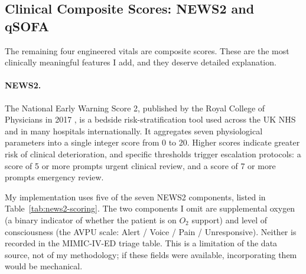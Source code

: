 \subsection*{Clinical Composite Scores: NEWS2 and qSOFA}

The remaining four engineered vitals are composite scores. These are the most clinically meaningful features I add, and they deserve detailed explanation.

\paragraph{NEWS2.} The National Early Warning Score 2, published by the Royal College of Physicians in 2017 \citep{rcp2017news2}, is a bedside risk-stratification tool used across the UK NHS and in many hospitals internationally. It aggregates seven physiological parameters into a single integer score from 0 to 20. Higher scores indicate greater risk of clinical deterioration, and specific thresholds trigger escalation protocols: a score of 5 or more prompts urgent clinical review, and a score of 7 or more prompts emergency review.

My implementation uses five of the seven NEWS2 components, listed in Table~\ref{tab:news2-scoring}. The two components I omit are supplemental oxygen (a binary indicator of whether the patient is on $O_2$ support) and level of consciousness (the AVPU scale: Alert / Voice / Pain / Unresponsive). Neither is recorded in the MIMIC-IV-ED triage table. This is a limitation of the data source, not of my methodology; if these fields were available, incorporating them would be mechanical.

